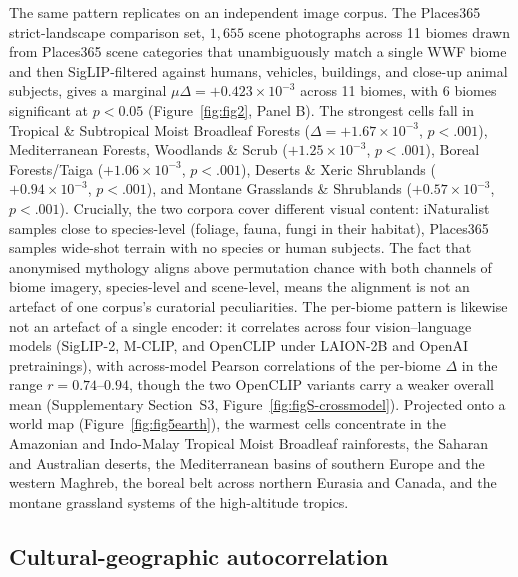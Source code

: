 \documentclass[11pt,a4paper]{article}
\begin{document}
The same pattern replicates on an independent image corpus. The
Places365 strict-landscape comparison set, $1{,}655$ scene
photographs across 11 biomes drawn from Places365 scene categories
that unambiguously match a single WWF biome and then
SigLIP-filtered against humans, vehicles, buildings, and close-up
animal subjects, gives a marginal $\mu\Delta = +0.423\times 10^{-3}$
across 11 biomes, with 6 biomes significant at $p<0.05$
(Figure~\ref{fig:fig2}, Panel B). The strongest cells fall in
Tropical \& Subtropical Moist Broadleaf Forests ($\Delta = +1.67
\times 10^{-3}$, $p<.001$), Mediterranean Forests, Woodlands \&
Scrub ($+1.25\times 10^{-3}$, $p<.001$), Boreal Forests/Taiga
($+1.06\times 10^{-3}$, $p<.001$), Deserts \& Xeric Shrublands
($+0.94\times 10^{-3}$, $p<.001$), and Montane Grasslands \&
Shrublands ($+0.57\times 10^{-3}$, $p<.001$). Crucially, the two
corpora cover different visual content: iNaturalist samples close
to species-level (foliage, fauna, fungi in their habitat),
Places365 samples wide-shot terrain with no species or human
subjects. The fact that anonymised mythology aligns above
permutation chance with both channels of biome imagery,
species-level and scene-level, means the alignment is not an
artefact of one corpus's curatorial peculiarities. The per-biome
pattern is likewise not an artefact of a single encoder: it
correlates across four vision--language models (SigLIP-2, M-CLIP,
and OpenCLIP under LAION-2B and OpenAI pretrainings), with
across-model Pearson correlations of the per-biome $\Delta$ in the
range $r=0.74$--$0.94$, though the two OpenCLIP variants carry a
weaker overall mean (Supplementary Section~S3,
Figure~\ref{fig:figS-crossmodel}). Projected onto
a world map (Figure~\ref{fig:fig5earth}), the warmest cells
concentrate in the Amazonian and Indo-Malay Tropical Moist
Broadleaf rainforests, the Saharan and Australian deserts, the
Mediterranean basins of southern Europe and the western Maghreb,
the boreal belt across northern Eurasia and Canada, and the
montane grassland systems of the high-altitude tropics.

\subsection*{Cultural-geographic autocorrelation}
\end{document}
